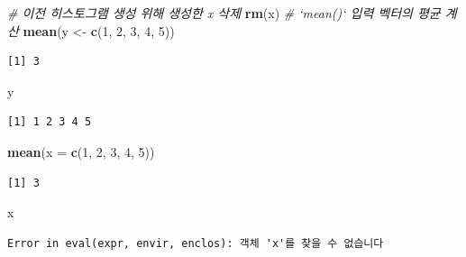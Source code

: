 \documentclass[11pt,a4paper]{book}
\newenvironment{Shaded}{\begin{snugshade}}{\end{snugshade}}
\newcommand{\KeywordTok}[1]{\textcolor[rgb]{0.13,0.29,0.53}{\textbf{#1}}}
\newcommand{\DataTypeTok}[1]{\textcolor[rgb]{0.13,0.29,0.53}{#1}}
\newcommand{\DecValTok}[1]{\textcolor[rgb]{0.00,0.00,0.81}{#1}}
\newcommand{\StringTok}[1]{\textcolor[rgb]{0.31,0.60,0.02}{#1}}
\newcommand{\CommentTok}[1]{\textcolor[rgb]{0.56,0.35,0.01}{\textit{#1}}}
\newcommand{\NormalTok}[1]{#1}
\theoremstyle{definition}
\theoremstyle{definition}
\theoremstyle{definition}
\theoremstyle{remark}
\begin{document}
\footnotesize

\begin{Shaded}
\begin{Highlighting}[]
\CommentTok{# 이전 히스토그램 생성 위해 생성한 x 삭제}
\KeywordTok{rm}\NormalTok{(x)}
\CommentTok{# `mean()` 입력 벡터의 평균 계산}
\KeywordTok{mean}\NormalTok{(y <-}\StringTok{ }\KeywordTok{c}\NormalTok{(}\DecValTok{1}\NormalTok{, }\DecValTok{2}\NormalTok{, }\DecValTok{3}\NormalTok{, }\DecValTok{4}\NormalTok{, }\DecValTok{5}\NormalTok{))}
\end{Highlighting}
\end{Shaded}

\begin{verbatim}
[1] 3
\end{verbatim}

\begin{Shaded}
\begin{Highlighting}[]
\NormalTok{y}
\end{Highlighting}
\end{Shaded}

\begin{verbatim}
[1] 1 2 3 4 5
\end{verbatim}

\begin{Shaded}
\begin{Highlighting}[]
\KeywordTok{mean}\NormalTok{(}\DataTypeTok{x =} \KeywordTok{c}\NormalTok{(}\DecValTok{1}\NormalTok{, }\DecValTok{2}\NormalTok{, }\DecValTok{3}\NormalTok{, }\DecValTok{4}\NormalTok{, }\DecValTok{5}\NormalTok{))}
\end{Highlighting}
\end{Shaded}

\begin{verbatim}
[1] 3
\end{verbatim}

\begin{Shaded}
\begin{Highlighting}[]
\NormalTok{x}
\end{Highlighting}
\end{Shaded}

\begin{verbatim}
Error in eval(expr, envir, enclos): 객체 'x'를 찾을 수 없습니다
\end{verbatim}

\normalsize
\end{document}
